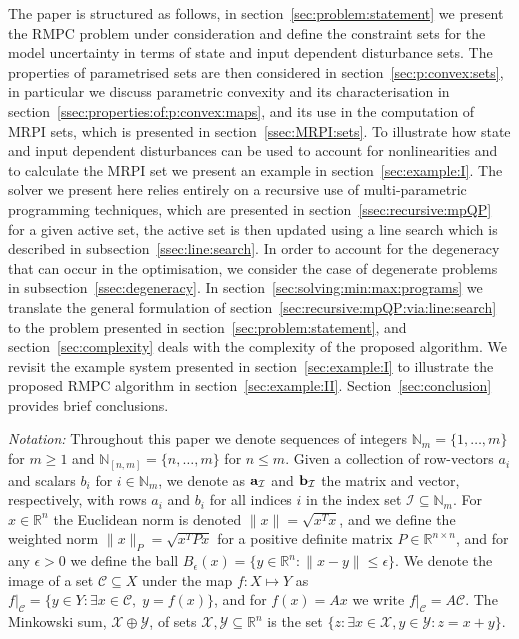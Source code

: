 \documentclass[journal]{IEEEtran}
\theoremstyle{remark}
\theoremstyle{definition}
\begin{document}
The paper is structured as follows, in section~\ref{sec:problem:statement} we present the RMPC problem under consideration
and define the constraint sets for the model uncertainty in terms of state and input dependent disturbance sets.
%
The properties of parametrised sets are then considered in section~\ref{sec:p:convex:sets}, in particular we discuss
parametric convexity and its characterisation in section~\ref{ssec:properties:of:p:convex:maps}, and its use in the computation of MRPI sets, which is presented in section~\ref{ssec:MRPI:sets}.
%
To illustrate how state and input dependent disturbances can be used to account for nonlinearities and 
to calculate the MRPI set we present an example in section~\ref{sec:example:I}.
%
The solver we present here relies entirely on a recursive use of multi-parametric programming techniques, 
which are presented in section~\ref{ssec:recursive:mpQP} for a given active set, the active set is then
updated using a line search which is described in subsection~\ref{ssec:line:search}. In order to account for the 
degeneracy that can occur in the optimisation, we consider the case of degenerate problems in subsection~\ref{ssec:degeneracy}.
%
In section~\ref{sec:solving:min:max:programs} we translate the general formulation of section~\ref{sec:recursive:mpQP:via:line:search}
to the problem presented in section~\ref{sec:problem:statement}, and section~\ref{sec:complexity}
deals with the complexity of the proposed algorithm.
%
We revisit the example system presented in section~\ref{sec:example:I} to illustrate the proposed RMPC
algorithm in section~\ref{sec:example:II}.
%
Section~\ref{sec:conclusion} provides brief conclusions.

\emph{Notation:} Throughout this paper 
%
we denote sequences of integers $\mathbb N_m = \{1,\ldots,m\}$ for $m\geq 1$ and $\mathbb N_{[n,m]} = \{n,\ldots,m\}$ for $n\leq m$.
%
Given a collection of row-vectors $a_i$ and scalars $b_i$ for $i\in\mathbb N_m$, we denote as ${\bf{a}}_{\mathcal I}$ and ${\bf{b}}_{\mathcal I}$ the matrix and vector, respectively, with rows $a_i$ and $b_i$ for all indices $i$ in the index set $\mathcal I\subseteq \mathbb N_m$.
%
For $x\in\mathbb R^n$ the Euclidean norm is denoted $\|x\|=\sqrt{x^T x}$, and we define the weighted norm $\|x\|_P=\sqrt{x^T P x}$ for a positive definite matrix $P\in\mathbb R^{n\times n}$, and for any $\epsilon > 0$ we define the ball $B_\epsilon(x) = \{y\in\mathbb R^n : \|x-y\| \leq \epsilon\}$.
%
We denote the image of a set $\mathcal C\subseteq X$ under the map $f:X\mapsto Y$ as $f\vert_{\mathcal C} = \{y\in Y:\exists x\in\mathcal C,\;y=f(x)\}$, and for $f(x) = Ax$ we write $f\vert_{\mathcal{C}} = A\mathcal{C}$.
%
The Minkowski sum, $\mathcal{X}\oplus\mathcal{Y}$, of sets $\mathcal{X},\mathcal{Y}\subseteq\mathbb{R}^n$ is the set $\{z: \exists x\in\mathcal{X}, y\in\mathcal{Y} : z = x+y\}$.
%
\end{document}
